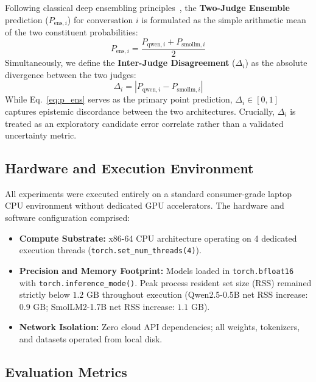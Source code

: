 Following classical deep ensembling principles~\cite{lakshminarayanan2017simple}, the \textbf{Two-Judge Ensemble} prediction ($P_{\text{ens}, i}$) for conversation $i$ is formulated as the simple arithmetic mean of the two constituent probabilities:
\begin{equation}
    P_{\text{ens}, i} = \frac{P_{\text{qwen}, i} + P_{\text{smollm}, i}}{2}
    \label{eq:p_ens}
\end{equation}
Simultaneously, we define the \textbf{Inter-Judge Disagreement} ($\Delta_i$) as the absolute divergence between the two judges:
\begin{equation}
    \Delta_i = |P_{\text{qwen}, i} - P_{\text{smollm}, i}|
    \label{eq:delta}
\end{equation}
While Eq.~\eqref{eq:p_ens} serves as the primary point prediction, $\Delta_i \in [0, 1]$ captures epistemic discordance between the two architectures. Crucially, $\Delta_i$ is treated as an exploratory candidate error correlate rather than a validated uncertainty metric.

\subsection{Hardware and Execution Environment}
\label{sec:hardware_environment}

All experiments were executed entirely on a standard consumer-grade laptop CPU environment without dedicated GPU accelerators. The hardware and software configuration comprised:
\begin{itemize}
    \item \textbf{Compute Substrate:} x86-64 CPU architecture operating on 4 dedicated execution threads (\texttt{torch.set\_num\_threads(4)}).
    \item \textbf{Precision and Memory Footprint:} Models loaded in \texttt{torch.bfloat16} with \texttt{torch.inference\_mode()}. Peak process resident set size (RSS) remained strictly below $1.2\text{ GB}$ throughout execution (Qwen2.5-0.5B net RSS increase: $0.9\text{ GB}$; SmolLM2-1.7B net RSS increase: $1.1\text{ GB}$).
    \item \textbf{Network Isolation:} Zero cloud API dependencies; all weights, tokenizers, and datasets operated from local disk.
\end{itemize}

\subsection{Evaluation Metrics}
\label{sec:evaluation_metrics}

